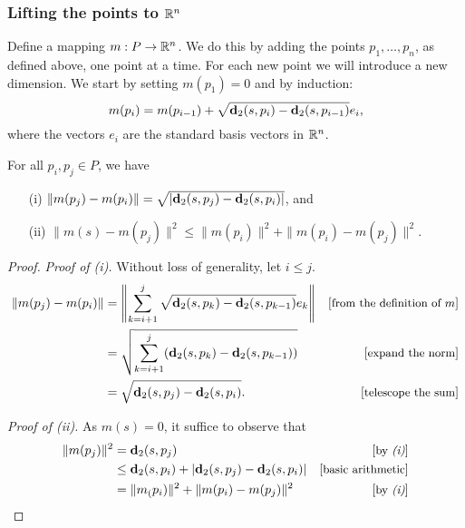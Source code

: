 \subsubsection{Lifting the points to $\mathbb{R}^n$} %
\label{sec:lifting}

  Define a mapping $m: P \to \mathbb{R}^n$.  We do this by adding the points $p_1, \ldots, p_n$, as defined above, one point at a time. 
  For each new point we will introduce a new dimension. We start by setting $m(p_1) = 0$ and by induction:
  \begin{equation}\label{eq:defn_of_m}
    m(p_i) = m(p_{i-1}) + \sqrt{\mathbf{d}_2(s, p_i) - \mathbf{d}_2(s, p_{i-1})} e_i,
  \end{equation}
  where the vectors $e_i$ are the standard basis vectors in $\mathbb{R}^n$.

  \begin{lemma}\label{lem:m_and_dist}
    For all $p_i, p_j\in P$, we have 
    \begin{enumerate}
      \item[(i)] $\|m(p_j) - m(p_i)\| = \sqrt{|\mathbf{d}_2(s,p_j) - \mathbf{d}_2(s,p_i)|}$, and
      \item[(ii)]$\|m(s) - m(p_j)\|^2 \le \|m(p_i)\|^2 + \|m(p_i) - m(p_j)\|^2$.
    \end{enumerate}
  \end{lemma}
  \begin{proof}
    \emph{Proof of (i).}
    Without loss of generality, let $i \le j$.
    \begin{align*}
      \|m(p_j) - m(p_i)\| &= \left\|\sum_{k=i+1}^j \sqrt{\mathbf{d}_2(s, p_k) - \mathbf{d}_2(s, p_{k-1})} e_k \right\| &\left[\text{\small{from the definition of $m$}}\right]\\
      &= \sqrt{\sum_{k=i+1}^j (\mathbf{d}_2(s, p_k) - \mathbf{d}_2(s, p_{k-1}))}&\left[\text{\small{expand the norm}}\right]\\
      &= \sqrt{\mathbf{d}_2(s, p_j) - \mathbf{d}_2(s, p_i)}. &\left[\text{\small{telescope the sum}}\right]
    \end{align*}

    \noindent\emph{Proof of (ii).}
    As $m(s) = 0$, it suffice to observe that
    \begin{align*}
      \|m(p_j)\|^2
        &= \mathbf{d}_2(s, p_j) &\left[\text{\small{by \emph{(i)}}}\right]\\
        &\le \mathbf{d}_2(s, p_i) + |\mathbf{d}_2(s,p_j) - \mathbf{d}_2(s,p_i)|&\left[\text{\small{basic arithmetic}}\right]\\
        &= \|m_(p_i)\|^2 + \|m(p_i) - m(p_j)\|^2 &\left[\text{\small{by \emph{(i)}}}\right]
    \end{align*}
  \end{proof}

